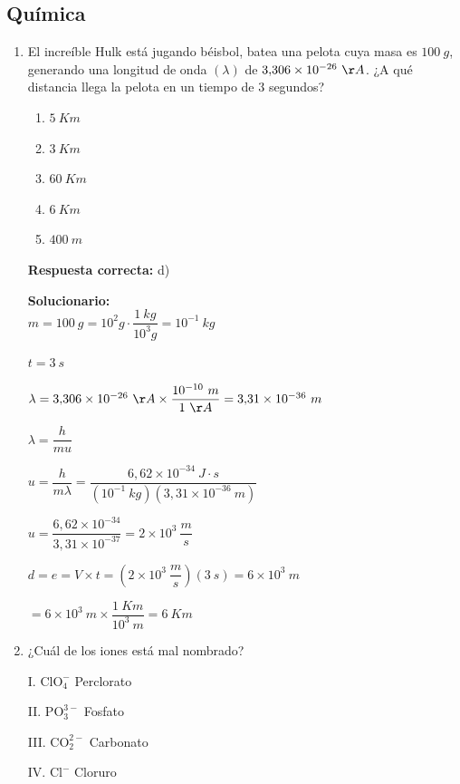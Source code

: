 


\subsection*{Química}

\begin{enumerate}
	
	\item El increíble Hulk está jugando béisbol, batea una pelota cuya masa es $100\ g$, generando una longitud de onda $(\lambda)$ de $3{,}306\times10^{-26}\ \AA$. ¿A qué distancia llega la pelota en un tiempo de $3$ segundos?
	\begin{enumerate}[label=\alph*)]
		\item $5\ Km$
		\item $3\ Km$
		\item $60\ Km$
		\item $6\ Km$
		\item $400\ m$
	\end{enumerate}
	\textbf{Respuesta correcta:} d)
	
	\vspace{2mm}
	\textbf{Solucionario:}\\
	
	$m=100\ g=10^2g\cdot\dfrac{1\ kg}{10^3g}=10^{-1}\ kg$
	
	$t=3\ s$
	
	$\lambda=3{,}306\times10^{-26}\ \AA\times\dfrac{10^{-10}\ m}{1\ \AA}=3{,}31\times10^{-36}\ m$
	
	$\lambda=\dfrac{h}{mu}$
	
	$u=\dfrac{h}{m\lambda}=\dfrac{6{,}62\times10^{-34}\ J\cdot s}{(10^{-1}\ kg)(3{,}31\times10^{-36}\ m)}$
	
	$u=\dfrac{6{,}62\times10^{-34}}{3{,}31\times10^{-37}}=2\times10^3\ \dfrac{m}{s}$
	
	$d=e=V\times t=(2\times10^3\ \dfrac{m}{s})(3\ s)=6\times10^3\ m$
	
	$=6\times10^3\ m\times\dfrac{1\ Km}{10^3\ m}=6\ Km$
	
	\vspace{6mm}
	
	\item ¿Cuál de los iones está mal nombrado?
	
	I. $\mathrm{ClO_4^-}$ Perclorato
	
	II. $\mathrm{PO_3^{3-}}$ Fosfato
	
	III. $\mathrm{CO_2^{2-}}$ Carbonato
	
	IV. $\mathrm{Cl^-}$ Cloruro
	

\end{enumerate}
